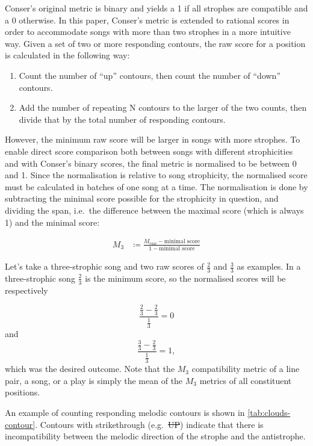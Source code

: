 \documentclass[twoside]{article}
\begin{document}
Conser's original metric is binary and yields a 1 if all strophes are compatible and a 0 otherwise. In this paper, Conser’s metric is extended to rational scores in order to accommodate songs with more than two strophes in a more intuitive way. Given a set of two or more responding contours, the raw score for a position is calculated in the following way:

\begin{enumerate}
    \item Count the number of ``up'' contours, then count the number of ``down'' contours.
    
    \item Add the number of repeating N contours to the larger of the two counts, then divide that by the total number of responding contours.
\end{enumerate}

However, the minimum raw score will be larger in songs with more strophes. To enable direct score comparison both between songs with different strophicities and with Conser's binary scores, the final metric is normalised to be between 0 and 1. Since the normalisation is relative to song strophicity, the normalised score must be calculated in batches of one song at a time. The normalisation is done by subtracting the minimal score possible for the strophicity in question, and dividing the span, i.e.\ the difference between the maximal score (which is always 1) and the minimal score:

\begin{align*}
    M_{3} &\coloneqq \frac{M_{raw} - \text{minimal score}}{1 - \text{minimal score}}
\end{align*}

Let's take a three-strophic song and two raw scores of $\frac{2}{3}$ and $\frac{3}{3}$ as examples. In a three-strophic song $\frac{2}{3}$ is the minimum score, so the normalised scores will be respectively

\[
\frac{\frac{2}{3}-\frac{2}{3}}{\frac{1}{3}} = 0
\]
and
\[
\frac{\frac{3}{3}-\frac{2}{3}}{\frac{1}{3}} = 1,
\]
which was the desired outcome. Note that the $M_3$ compatibility metric of a line pair, a song, or a play is simply the mean of the $M_3$ metrics of all constituent positions.

An example of counting responding melodic contours is shown in \autoref{tab:clouds-contour}. Contours with strikethrough (e.g.\ \sout{UP}) indicate that there is incompatibility between the melodic direction of the strophe and the antistrophe.
\end{document}
